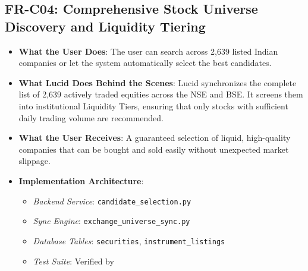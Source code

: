 \subsection{FR-C04: Comprehensive Stock Universe Discovery and Liquidity Tiering}
\begin{itemize}
    \item \textbf{What the User Does}: The user can search across 2,639 listed Indian companies or let the system automatically select the best candidates.
    \item \textbf{What Lucid Does Behind the Scenes}: Lucid synchronizes the complete list of 2,639 actively traded equities across the NSE and BSE. It screens them into institutional Liquidity Tiers, ensuring that only stocks with sufficient daily trading volume are recommended.
    \item \textbf{What the User Receives}: A guaranteed selection of liquid, high-quality companies that can be bought and sold easily without unexpected market slippage.
    \item \textbf{Implementation Architecture}:
    \begin{itemize}
        \item \textit{Backend Service}: \texttt{candidate\_selection.py}
        \item \textit{Sync Engine}: \texttt{exchange\_universe\_sync.py}
        \item \textit{Database Tables}: \texttt{securities}, \texttt{instrument\_listings}
        \item \textit{Test Suite}: Verified by 
    \end{itemize}
\end{itemize}

